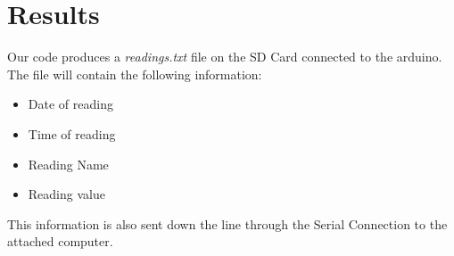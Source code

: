 \documentclass{article}
\begin{document}
  \section*{Results}
  Our code produces a \textit{readings.txt} file on the SD Card connected to the arduino. The file will contain the following information:\\
  \begin{itemize}
    \item Date of reading
    \item Time of reading
    \item Reading Name
    \item Reading value
  \end{itemize}
  This information is also sent down the line through the Serial Connection to the attached computer.
\end{document}
